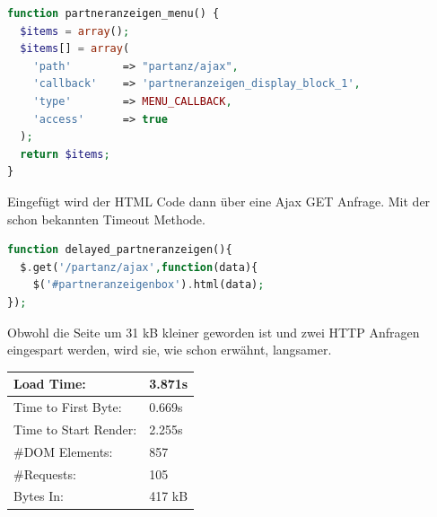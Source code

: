 \begin{minipage}[t]{1\textwidth}
\begin{lstlisting}[language=php,label=Ajax - hook,caption=Ajax - hook]
function partneranzeigen_menu() {
  $items = array();
  $items[] = array(
    'path'        => "partanz/ajax",
    'callback'    => 'partneranzeigen_display_block_1',
    'type'        => MENU_CALLBACK,
    'access'      => true
  );
  return $items;
}
\end{lstlisting}
\end{minipage}
Eingefügt wird der HTML Code dann über eine Ajax GET Anfrage. Mit der schon bekannten Timeout Methode.
\begin{minipage}[t]{1\textwidth}
\begin{lstlisting}[language=php,label=Ajax - GET,caption=Ajax - GET]
function delayed_partneranzeigen(){
  $.get('/partanz/ajax',function(data){
    $('#partneranzeigenbox').html(data);
});
\end{lstlisting}
\end{minipage}
Obwohl die Seite um 31 kB kleiner geworden ist und zwei HTTP Anfragen eingespart werden, wird sie, wie schon erwähnt, langsamer.
\begin{table}
\caption{Ergebnis der Umprogrammierung des Partneranzeigen-Moduls}
    \begin{longtable}{ | p{3cm} | p{1.5cm} | }
    \hline
    Load Time: 			& 3.871s 	\\ \hline
    Time to First Byte:		& 0.669s  	\\ \hline
    Time to Start Render:	& 2.255s	\\ \hline
    \#DOM Elements:		& 857 		\\ \hline
    \#Requests:			& 105 		\\ \hline
    Bytes In:			& 417 kB 	\\ \hline
    \hline
    \end{longtable}
\end{table}

